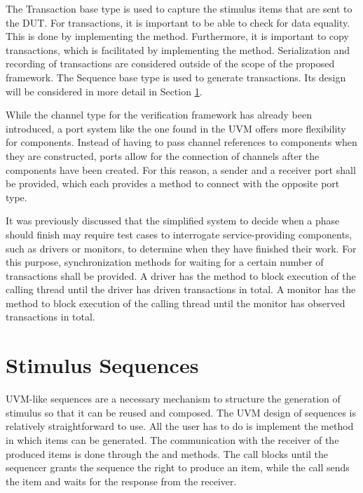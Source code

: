 The Transaction base type is used to capture the stimulus items that are sent to the DUT. For transactions, it is
important to be able to check for data equality. This is done by implementing the  method.
Furthermore, it is important to copy transactions, which is facilitated by implementing the  method.
Serialization and recording of transactions are considered outside of the scope of the proposed framework. The Sequence base
type is used to generate transactions. Its design will be considered in more detail in Section \ref{sec:stimulus_sequences}.

While the channel type for the verification framework has already been introduced, a port system like the one found in the UVM offers more flexibility for components. Instead of having to pass channel references to components when they are constructed, ports allow for the connection of channels after the components have been created. For this reason, a sender and a receiver port shall be provided, which each provides a  method to connect with the opposite port type. 

It was previously discussed that the simplified system to decide when a phase should finish may require test cases to interrogate service-providing components, such as drivers or monitors, to determine when they have finished their work. For this purpose, synchronization methods for waiting for a certain number of transactions shall be provided. A driver has the  method to block execution of the calling thread until the driver has driven  transactions in total. A monitor has the  method to block execution of the calling thread until the monitor has observed  transactions in total.

\section{Stimulus Sequences} %
\label{sec:stimulus_sequences}

UVM-like sequences are a necessary mechanism to structure the generation of stimulus so that it can be reused and composed.
The UVM design of sequences is relatively straightforward to use. All the user has to do is implement the
 method in which items can be generated. The communication with the receiver of the produced items is done
through the  and  methods. The  call blocks until the sequencer
grants the sequence the right to produce an item, while the  call sends the item and waits
for the response from the receiver.

